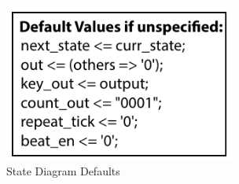 \documentclass{article}
\begin{document}

      \begin{figure}[H]
        \centering
        \includegraphics[width=3in]{img/StateDiagramDefaults}
        \caption{State Diagram Defaults}
      \end{figure}
    
\end{document}
